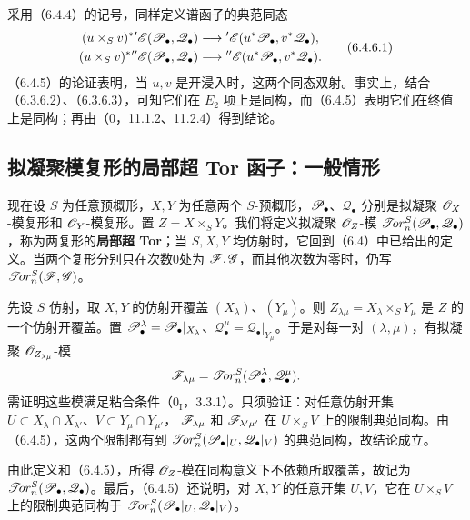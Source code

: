 采用（6.4.4）的记号，同样定义谱函子的典范同态
\begin{equation}
\begin{aligned}
 (u\times_S v)^*{}'\mathscr E(\mathscr P_\bullet,\mathscr Q_\bullet)
 &\longrightarrow{}'\mathscr E(u^*\mathscr P_\bullet,v^*\mathscr Q_\bullet),\\
 (u\times_S v)^*{}''\mathscr E(\mathscr P_\bullet,\mathscr Q_\bullet)
 &\longrightarrow{}''\mathscr E(u^*\mathscr P_\bullet,v^*\mathscr Q_\bullet).
\end{aligned}\tag{6.4.6.1}
\end{equation}
（6.4.5）的论证表明，当 $u,v$ 是开浸入时，这两个同态双射。事实上，结合（6.3.6.2）、（6.3.6.3），可知它们在 $E_2$ 项上是同构，而（6.4.5）表明它们在终值上是同构；再由（0，11.1.2、11.2.4）得到结论。

\subsection{拟凝聚模复形的局部超 Tor 函子：一般情形}
现在设 $S$ 为任意预概形，$X,Y$ 为任意两个 $S$-预概形，$\mathscr P_\bullet$、$\mathscr Q_\bullet$ 分别是拟凝聚 $\mathscr O_X$-模复形和 $\mathscr O_Y$-模复形。置 $Z=X\times_S Y$。我们将定义拟凝聚 $\mathscr O_Z$-模 $\mathscr{T}\!or_n^S(\mathscr P_\bullet,\mathscr Q_\bullet)$，称为两复形的\textbf{局部超 Tor}；当 $S,X,Y$ 均仿射时，它回到（6.4）中已给出的定义。当两个复形分别只在次数0处为 $\mathscr F,\mathscr G$，而其他次数为零时，仍写 $\mathscr{T}\!or_n^S(\mathscr F,\mathscr G)$。

先设 $S$ 仿射，取 $X,Y$ 的仿射开覆盖 $(X_\lambda)$、$(Y_\mu)$。则 $Z_{\lambda\mu}=X_\lambda\times_S Y_\mu$ 是 $Z$ 的一个仿射开覆盖。置
$\mathscr P_\bullet^\lambda=\mathscr P_\bullet|_{X_\lambda}$、$\mathscr Q_\bullet^\mu=\mathscr Q_\bullet|_{Y_\mu}$。于是对每一对 $(\lambda,\mu)$，有拟凝聚 $\mathscr O_{Z_{\lambda\mu}}$-模
\[
 \mathscr F_{\lambda\mu}=\mathscr{T}\!or_n^S(\mathscr P_\bullet^\lambda,\mathscr Q_\bullet^\mu).
\]
需证明这些模满足粘合条件（$0_{\mathrm I}$，3.3.1）。只须验证：对任意仿射开集
$U\subset X_\lambda\cap X_{\lambda'}$、$V\subset Y_\mu\cap Y_{\mu'}$，
$\mathscr F_{\lambda\mu}$ 和 $\mathscr F_{\lambda'\mu'}$ 在 $U\times_S V$ 上的限制典范同构。由（6.4.5），这两个限制都有到 $\mathscr{T}\!or_n^S(\mathscr P_\bullet|_U,\mathscr Q_\bullet|_V)$ 的典范同构，故结论成立。

由此定义和（6.4.5），所得 $\mathscr O_Z$-模在同构意义下不依赖所取覆盖，故记为 $\mathscr{T}\!or_n^S(\mathscr P_\bullet,\mathscr Q_\bullet)$。最后，（6.4.5）还说明，对 $X,Y$ 的任意开集 $U,V$，它在 $U\times_S V$ 上的限制典范同构于 $\mathscr{T}\!or_n^S(\mathscr P_\bullet|_U,\mathscr Q_\bullet|_V)$。

